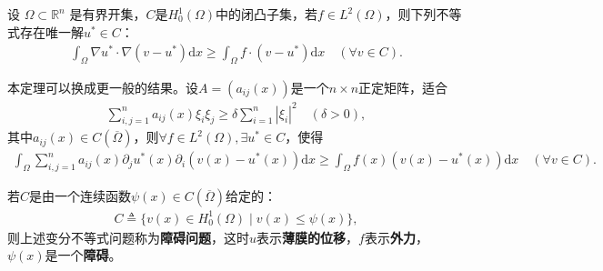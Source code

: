 \documentclass[../../main.tex]{subfiles}%
\begin{document}
\begin{theorem}
设 $\Omega \subset \mathbb{R}^n$ 是有界开集，$C$是$H_0^1(\Omega)$中的闭凸子集，若$f\in L^2(\Omega)$，则下列不等式存在唯一解$u^*\in C$：
\begin{align}
\int_\Omega \nabla u^*\cdot\nabla(v-u^*)\mathrm{d}x\geqslant\int_\Omega f\cdot(v-u^*)\mathrm{d}x\quad (\forall v\in C).
\label{eq:variational}
\end{align}
\end{theorem}
\begin{remark}
本定理可以换成更一般的结果。设$A=(a_{ij}(x))$是一个$n\times n$正定矩阵，适合
\begin{align*}
\sum\limits_{i,j=1}^n a_{ij}(x)\xi_i\xi_j\geqslant\delta\sum\limits_{i=1}^n |\xi_i|^2\quad (\delta>0),
\end{align*}
其中$a_{ij}(x)\in C(\overline{\Omega})$，则$\forall f\in L^2(\Omega),\exists u^*\in C$，使得
\begin{align*}
\int_\Omega \sum\limits_{i,j=1}^n a_{ij}(x)\partial_j u^*(x)\partial_i(v(x)-u^*(x))\mathrm{d}x\geqslant\int_\Omega f(x)(v(x)-u^*(x))\mathrm{d}x\quad (\forall v\in C).
\end{align*}
\end{remark}
\begin{remark}
若$C$是由一个连续函数$\psi(x)\in C(\overline{\Omega})$给定的：
\begin{align*}
C\triangleq\{v(x)\in H_0^1(\Omega)\mid v(x)\leqslant\psi(x)\},
\end{align*}
则上述变分不等式问题称为\textbf{障碍问题}，这时$u$表示\textbf{薄膜的位移}，$f$表示\textbf{外力}，$\psi(x)$是一个\textbf{障碍}。
\end{remark}
\end{document}
